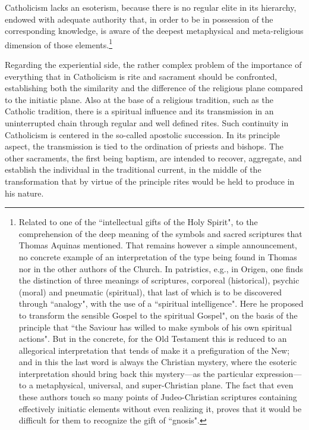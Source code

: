 Catholicism lacks an esoterism, because there is no regular elite in its hierarchy, endowed with adequate authority that, in order to be in possession of the corresponding knowledge, is aware of the deepest metaphysical and meta-religious dimension of those elements.\footnote{Related to one of the ``intellectual gifts of the Holy Spirit", to the comprehension of the deep meaning of the symbols and sacred scriptures that Thomas Aquinas mentioned. That remains however a simple announcement, no concrete example of an interpretation of the type being found in Thomas nor in the other authors of the Church. In patristics, e.g., in Origen, one finds the distinction of three meanings of scriptures, corporeal (historical), psychic (moral) and pneumatic (spiritual), that last of which is to be discovered through ``analogy", with the use of a ``spiritual intelligence". Here he proposed to transform the sensible Gospel to the spiritual Gospel", on the basis of the principle that ``the Saviour has willed to make symbols of his own spiritual actions". But in the concrete, for the Old Testament this is reduced to an allegorical interpretation that tends of make it a prefiguration of the New; and in this the last word is always the Christian mystery, where the esoteric interpretation should bring back this mystery—as the particular expression—to a metaphysical, universal, and super-Christian plane. The fact that even these authors touch so many points of Judeo-Christian scriptures containing effectively initiatic elements without even realizing it, proves that it would be difficult for them to recognize the gift of ``gnosis".}

Regarding the experiential side, the rather complex problem of the importance of everything that in Catholicism is rite and sacrament should be confronted, establishing both the similarity and the difference of the religious plane compared to the initiatic plane. Also at the base of a religious tradition, such as the Catholic tradition, there is a spiritual influence and its transmission in an uninterrupted chain through regular and well defined rites. Such continuity in Catholicism is centered in the so-called apostolic succession. In its principle aspect, the transmission is tied to the ordination of priests and bishops. The other sacraments, the first being baptism, are intended to recover, aggregate, and establish the individual in the traditional current, in the middle of the transformation that by virtue of the principle rites would be held to produce in his nature.

